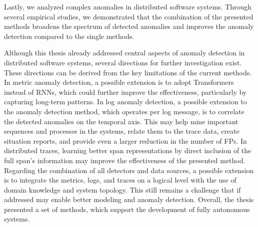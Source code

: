 Lastly, we analyzed complex anomalies in distributed software systems. Through several empirical studies, we demonstrated that the combination of the presented methods broadens the spectrum of detected anomalies and improves the anomaly detection compared to the single methods. 

Although this thesis already addressed central aspects of anomaly detection in distributed software systems, several directions for further investigation exist. These directions can be derived
from the key limitations of the current methods. In metric anomaly detection, a possible extension is to adopt Transformers~\cite{vaswani2017attention} instead of RNNs, which could further improve the effectiveness, particularly by capturing long-term patterns. In log anomaly detection, a possible extension to the anomaly detection method, which operates per log message, is to correlate the detected anomalies on the temporal axis. This may help mine important sequences and processes in the systems, relate them to the trace data, create situation reports, and provide even a larger reduction in the number of FPs. In distributed traces, learning better span representations by direct inclusion of the full span's information may improve the effectiveness of the presented method. Regarding the combination of all detectors and data sources, a possible extension is to integrate the metrics, logs, and traces on a logical level with the use of domain knowledge and system topology. This still remains a challenge that if addressed may enable better modeling and anomaly detection. Overall, the thesis presented a set of methods, which support the development of fully autonomous systems.